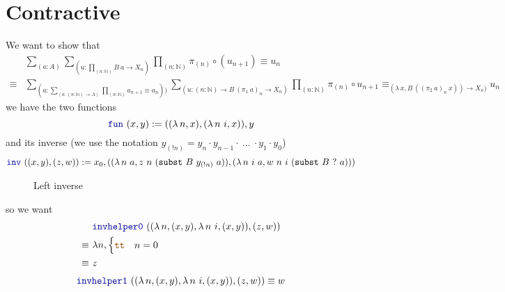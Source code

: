 \documentclass[twoside,11pt,openright]{report}
\newcommand*{\constant}[1]{\textcolor{orange!60!black}{\ensuremath{\mathtt{#1}}}}
\newcommand*{\function}[1]{\textcolor{blue!60!black}{\ensuremath{\mathtt{#1}}}}
\begin{document}
\chapter{Contractive}
We want to show that
\begin{align}
  &\sum_{(a : A)} \sum_{(u : \prod_{(n : \mathbb{N})} B~a \rightarrow X_n)} \prod_{(n : \mathbb{N})} \pi_{(n)} \circ (u_{n + 1}) \equiv u_n \\
  \equiv& \sum_{(a : \sum_{(a : (n : \mathbb{N}) \rightarrow A)} \prod_{(n : \mathbb{N})} a_{n+1} \equiv a_n))} \sum_{(u : (n : \mathbb{N}) \rightarrow B~(\pi_1~a)_n \rightarrow X_n)} \prod_{(n : \mathbb{N})} \pi_{(n)} \circ u_{n+1} \equiv_{(\lambda\,x, B~((\pi_2~a)_n~x)) \rightarrow X_n)} u_n
\end{align}
we have the two functions
\begin{equation}
  \function{fun}~(x , y) := ((\lambda\,n, x) , (\lambda\,n~i, x)) , y
\end{equation}
and its inverse (we use the notation \(y_{(!n)} = y_{n} \cdot y_{n-1} \cdot ~\dots~ \cdot y_1 \cdot y_0\))
\begin{equation}
  \function{inv}~((x , y) , (z , w)) := x_0 , ((\lambda\,n~a , z~n~(\mathtt{subst}~B~y_{(!n)}~a)) , (\lambda\,n~i~a, w~n~i~(\mathtt{subst}~B~?~a)))
\end{equation}

\begin{figure}[h]
  \centering
  \caption{Left inverse}
  \label{fig:contractive}
\end{figure}

so we want
\begin{align}
  &~\function{invhelper0}~((\lambda\,n, (x , y) , \lambda\,n~i, (x , y)) , (z , w)) \\
  \equiv&~\lambda n, \begin{cases} \constant{tt} & n = 0 \\  \end{cases} \\
  \equiv&~z
\end{align}
\begin{equation}
  \function{invhelper1}~((\lambda\,n, (x , y) , \lambda\,n~i, (x , y)) , (z , w)) \equiv w
\end{equation}
\end{document}
